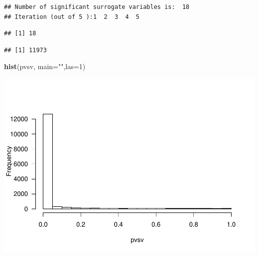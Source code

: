 \documentclass[]{article}
\newenvironment{Shaded}{\begin{snugshade}}{\end{snugshade}}
\newcommand{\KeywordTok}[1]{\textcolor[rgb]{0.13,0.29,0.53}{\textbf{{#1}}}}
\newcommand{\DataTypeTok}[1]{\textcolor[rgb]{0.13,0.29,0.53}{{#1}}}
\newcommand{\DecValTok}[1]{\textcolor[rgb]{0.00,0.00,0.81}{{#1}}}
\newcommand{\FloatTok}[1]{\textcolor[rgb]{0.00,0.00,0.81}{{#1}}}
\newcommand{\StringTok}[1]{\textcolor[rgb]{0.31,0.60,0.02}{{#1}}}
\newcommand{\NormalTok}[1]{{#1}}
\begin{document}
\begin{verbatim}
## Number of significant surrogate variables is:  18 
## Iteration (out of 5 ):1  2  3  4  5
\end{verbatim}

\begin{Shaded}
\end{Shaded}

\begin{verbatim}
## [1] 18
\end{verbatim}

\begin{Shaded}
\end{Shaded}

\begin{verbatim}
## [1] 11973
\end{verbatim}

\begin{Shaded}
\begin{Highlighting}[]
\KeywordTok{hist}\NormalTok{(pvsv, }\DataTypeTok{main=}\StringTok{""}\NormalTok{,}\DataTypeTok{las=}\DecValTok{1}\NormalTok{)}
\end{Highlighting}
\end{Shaded}

\includegraphics{IEO_project_files/figure-latex/Estimation of surrogate variables-1.pdf}
\end{document}
